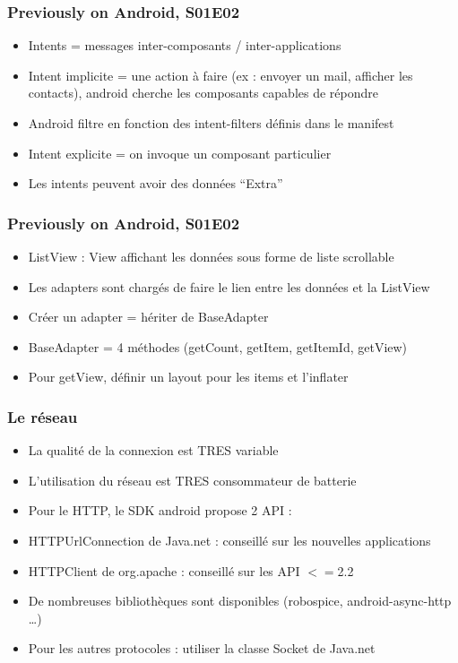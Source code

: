 \documentclass{beamer}
\begin{document}
\begin{frame}[fragile]
\frametitle{Previously on Android, S01E02}
\begin{itemize}
  \item Intents = messages inter-composants / inter-applications
  \item Intent implicite = une action à faire (ex : envoyer un mail, afficher
  les contacts), android cherche les composants capables de répondre
  \item Android filtre en fonction des intent-filters définis dans le manifest
  \item Intent explicite = on invoque un composant particulier
  \item Les intents peuvent avoir des données ``Extra''
\end{itemize}
\end{frame}
\begin{frame}[fragile]
\frametitle{Previously on Android, S01E02}
\begin{itemize}
  \item ListView : View affichant les données sous forme de liste scrollable
  \item Les adapters sont chargés de faire le lien entre les données et la
  ListView
  \item Créer un adapter = hériter de BaseAdapter
  \item BaseAdapter = 4 méthodes (getCount, getItem, getItemId, getView)
  \item Pour getView, définir un layout pour les items et l'inflater 
\end{itemize}
\end{frame}
\begin{frame}[fragile]
\frametitle{Le réseau}
\begin{itemize}
  \item La qualité de la connexion est TRES variable
  \item L'utilisation du réseau est TRES consommateur de batterie 
  \item Pour le HTTP, le SDK android propose 2 API :
  \item HTTPUrlConnection de Java.net : conseillé sur les nouvelles applications
  \item HTTPClient de org.apache : conseillé sur les API $<=$2.2
  \item De nombreuses bibliothèques sont disponibles (robospice, android-async-http \ldots)
  \item Pour les autres protocoles : utiliser la classe Socket de Java.net
\end{itemize}
\end{frame}
\end{document}

